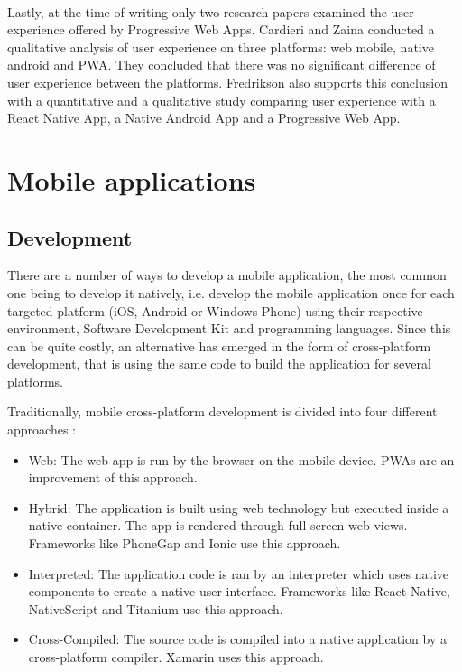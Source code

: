 \documentclass{kththesis}
\begin{document}
\paragraph{}
Lastly, at the time of writing only two research papers examined the user experience offered by Progressive Web Apps. Cardieri and Zaina \cite{PWA_UX_comparison_study} conducted a qualitative analysis of user experience on three platforms: web mobile, native android and PWA. They concluded that there was no significant difference of user experience between the platforms. Fredrikson \cite{emulating_native_w_crossplatform} also supports this conclusion with a quantitative and a qualitative study comparing user experience with a React Native App, a Native Android App and a Progressive Web App. 



\section{Mobile applications}
\subsection{Development}
There are a number of ways to develop a mobile application, the most common one being to develop it natively, i.e. develop the mobile application once for each targeted platform (iOS, Android or Windows Phone) using their respective environment, Software Development Kit and programming languages. Since this can be quite costly, an alternative has emerged in the form of cross-platform development, that is using the same code to build the application for several platforms.


Traditionally, mobile cross-platform development is divided into four different approaches \cite{CrossPlatform_dev}:
\begin{itemize}
    \item Web: The web app is run by the browser on the mobile device. PWAs are an improvement of this approach.
    \item Hybrid: The application is built using web technology but executed inside a native container. The app is rendered through full screen web-views. Frameworks like PhoneGap and Ionic \cite{crossplatform_approaches} use this approach.
    \item Interpreted: The application code is ran by an interpreter which uses native components to create a native user interface. Frameworks like React Native, NativeScript and Titanium \cite{emulating_native_w_crossplatform} use this approach.
    \item Cross-Compiled: The source code is compiled into a native application by a cross-platform compiler. Xamarin \cite{crossplatform_approaches} uses this approach. 
\end{itemize}
\end{document}
